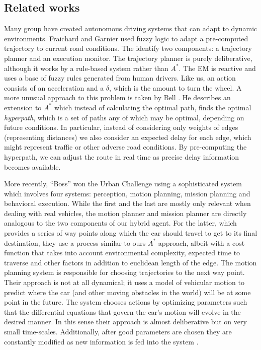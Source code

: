 \documentclass{article}
\begin{document}
\subsection{Related works}
Many group have created autonomous driving systems that can adapt to
dynamic environments. Fraichard and Garnier \cite{fuzzy} used fuzzy
logic to adapt a pre-computed trajectory to current road
conditions. The identify two components: a trajectory planner and an
execution monitor. The trajectory planner is purely deliberative,
although it works by a rule-based system rather than $A^*$. The EM is
reactive and uses a base of fuzzy rules generated from human
drivers. Like us, an action consists of an acceleration and a
$\delta$, which is the amount to turn the wheel. A more unusual
approach to this problem is taken by Bell \cite{hyperstar}. He
describes an extension to $A^*$ which instead of calculating the
optimal path, finds the optimal \emph{hyperpath}, which is a set of
paths any of which may be optimal, depending on future conditions. In
particular, instead of considering only weights of edges (representing
distances) we also consider an expected delay for each edge, which
might represent traffic or other adverse road conditions. By
pre-computing the hyperpath, we can adjust the route in real time as
precise delay information becomes available.

More recently, ``Boss'' won the Urban Challenge using a sophisticated
system which involves four systems: perception, motion planning,
mission planning and behavioral execution. While the first and the
last are mostly only relevant when dealing with real vehicles, the
motion planner and mission planner are directly analogous to the two
components of our hybrid agent. For the latter, which provides a
series of way points along which the car should travel to get to its
final destination, they use a process similar to ours $A^*$ approach,
albeit with a cost function that takes into account environmental
complexity, expected time to traverse and other factors in addition to
euclidean length of the edge. The motion planning system is
responsible for choosing trajectories to the next way point. Their
approach is not at all dynamical; it uses a model of vehicular motion
to predict where the car (and other moving obstacles in the world)
will be at some point in the future. The system chooses actions by
optimizing parameters such that the differential equations that govern
the car's motion will evolve in the desired manner. In this sense
their approach is almost deliberative but on very small
time-scales. Additionally, after good parameters are chosen they are
constantly modified as new information is fed into the system \cite{bossx}.
\end{document}
